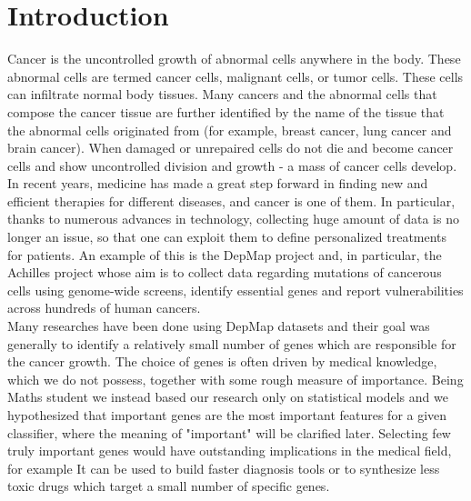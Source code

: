 \documentclass[a4paper,11pt, oneside]{article}  %
\begin{document}
\section{Introduction}
Cancer is the uncontrolled growth of abnormal cells anywhere in the body. These abnormal cells are termed cancer cells, malignant cells, or tumor cells.  These cells can  infiltrate normal body tissues. Many cancers and the abnormal cells that compose the cancer tissue are further identified by  the  name  of  the  tissue  that  the  abnormal  cells  originated  from  (for  example,  breast cancer, lung cancer and brain cancer).  When damaged or unrepaired cells do not die and become cancer cells and show uncontrolled division and growth - a mass of cancer cells develop. 
In recent years, medicine has made a great step forward in finding new and efficient therapies for different diseases,  and cancer is one of them.  In particular,   thanks to numerous advances in technology,  collecting huge amount of data is no longer an issue,  so that one can exploit them to define personalized treatments for patients.  An example of this is the DepMap project and,  in particular,  the Achilles project whose aim is to collect data regarding mutations of cancerous cells using genome-wide screens,  identify essential genes and report vulnerabilities across hundreds of human cancers.  \\
Many researches have been done using DepMap datasets and their goal was generally to identify a relatively small number of genes which are responsible for the cancer growth.  The choice of genes is often driven by medical knowledge,  which we do not possess,  together with some rough measure of importance.  Being Maths student we instead based our research only on statistical models and we hypothesized that important genes are the most important features for a given classifier,  where the meaning of "important" will be clarified later. Selecting few truly important genes would have outstanding implications in the medical field, for example It can be used to build faster diagnosis tools or to synthesize less toxic drugs which target a small number of specific genes. 
\end{document}

